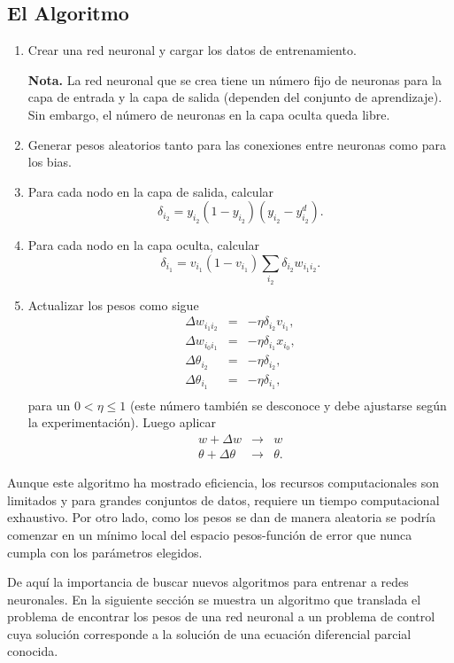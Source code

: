 \documentclass[11pt,letterpaper]{article}
\theoremstyle{definition}
\theoremstyle{definition}
\theoremstyle{definition}
\theoremstyle{definition}
\theoremstyle{definition}
\theoremstyle{definition}
\theoremstyle{definition}
\theoremstyle{definition}
\begin{document}
\subsection{El Algoritmo}
\begin{enumerate}
	\item Crear una red neuronal y cargar los datos de entrenamiento. 
	
	\textbf{Nota. }La red neuronal que se crea tiene un número fijo de neuronas para la capa de entrada y la capa de salida (dependen del conjunto de aprendizaje). Sin embargo, el número de neuronas en la capa oculta queda libre.
	\item Generar pesos aleatorios tanto para las conexiones entre neuronas como para los bias.
	\item Para cada nodo en la capa de salida, calcular
	\[ \delta_{i_2}= y_{i_2}(1-y_{i_2})(y_{i_2}-y_{i_2}^d). \]
	\item Para cada nodo en la capa oculta, calcular
	\[ \delta_{i_1} = v_{i_1} (1-v_{i_1})  \displaystyle\sum_{i_2} \delta_{i_2} w_{i_1 i_2}. \]
	\item Actualizar los pesos como sigue
	\begin{eqnarray*}
		\Delta w_{i_1 i_2}     &=&-\eta \delta_{i_2} v_{i_1},\\
		\Delta w_{i_0 i_1}     &=&-\eta \delta_{i_1} x_{i_0},\\
		\Delta \theta_{i_2}    &=&-\eta \delta_{i_2},\\
		\Delta \theta_{i_1}    &=&-\eta \delta_{i_1},\\
	\end{eqnarray*}
	para un $ 0<\eta\leq 1 $ (este número también se desconoce y debe ajustarse según la experimentación). Luego aplicar
	\begin{eqnarray*}
		w+\Delta w    	    &\to&w \\
		\theta+\Delta \theta&\to&\theta.
	\end{eqnarray*}
\end{enumerate}

Aunque este algoritmo ha mostrado eficiencia, los recursos computacionales son limitados y para grandes conjuntos de datos, requiere un tiempo computacional exhaustivo. Por otro lado, como los pesos se dan de manera aleatoria se podría comenzar en un mínimo local del espacio pesos-función de error que nunca cumpla con los parámetros elegidos.

De aquí la importancia de buscar nuevos algoritmos para entrenar a redes neuronales. En la siguiente  sección se muestra un algoritmo que translada el problema de encontrar los pesos de una red neuronal a un problema de control cuya solución corresponde a la solución de una ecuación diferencial parcial conocida.





\end{document}
